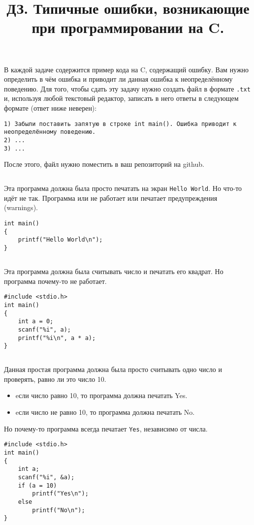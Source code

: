 \documentclass{article}
\begin{document}
\title{ДЗ. Типичные ошибки, возникающие при программировании на C. \vspace{-5ex}}\date{}\maketitle

\noindent В каждой задаче содержится пример кода на C, содержащий ошибку. Вам нужно определить в чём ошибка и приводит ли данная ошибка к неопределённому поведению.
Для того, чтобы сдать эту задачу нужно создать файл в формате \texttt{.txt} и, используя любой текстовый редактор, записать в него ответы в следующем формате (ответ ниже неверен):
\begin{verbatim}
1) Забыли поставить запятую в строке int main(). Ошибка приводит к неопределённому поведению.
2) ...
3) ...
\end{verbatim} 
После этого, файл нужно поместить в ваш репозиторий на github.


\subsection{}
Эта программа должна была просто печатать на экран \texttt{Hello World}. Но что-то идёт не так. Программа или не работает или печатает предупреждения (warnings).
\begin{lstlisting}
int main()
{
    printf("Hello World\n");
}
\end{lstlisting}

\subsection{}
Эта программа должна была считывать число и печатать его квадрат.
Но программа почему-то не работает.
\begin{lstlisting}
#include <stdio.h>
int main()
{
    int a = 0;
    scanf("%i", a);
    printf("%i\n", a * a);
}
\end{lstlisting}

\subsection{}
Данная простая программа должна была просто считывать одно число и проверять, равно ли это число 10.
\begin{itemize}
\item eсли число равно 10, то программа должна печатать Yes.
\item eсли число не равно 10, то программа должна печатать No.
\end{itemize}
Но почему-то программа всегда печатает \texttt{Yes}, независимо от числа.
\begin{lstlisting}
#include <stdio.h>
int main()
{
    int a;
    scanf("%i", &a);
    if (a = 10)
        printf("Yes\n");
    else
        printf("No\n");
}
\end{lstlisting}
\end{document}
